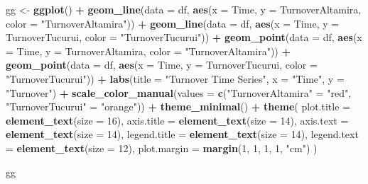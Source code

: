 \documentclass[
]{article}
\newenvironment{Shaded}{\begin{snugshade}}{\end{snugshade}}
\newcommand{\AttributeTok}[1]{\textcolor[rgb]{0.13,0.29,0.53}{#1}}
\newcommand{\DecValTok}[1]{\textcolor[rgb]{0.00,0.00,0.81}{#1}}
\newcommand{\FunctionTok}[1]{\textcolor[rgb]{0.13,0.29,0.53}{\textbf{#1}}}
\newcommand{\NormalTok}[1]{#1}
\newcommand{\OtherTok}[1]{\textcolor[rgb]{0.56,0.35,0.01}{#1}}
\newcommand{\SpecialCharTok}[1]{\textcolor[rgb]{0.81,0.36,0.00}{\textbf{#1}}}
\newcommand{\StringTok}[1]{\textcolor[rgb]{0.31,0.60,0.02}{#1}}
\begin{document}
\begin{Shaded}
\begin{Highlighting}[]
\NormalTok{gg }\OtherTok{\textless{}{-}} \FunctionTok{ggplot}\NormalTok{() }\SpecialCharTok{+}
  \FunctionTok{geom\_line}\NormalTok{(}\AttributeTok{data =}\NormalTok{ df, }\FunctionTok{aes}\NormalTok{(}\AttributeTok{x =}\NormalTok{ Time, }\AttributeTok{y =}\NormalTok{ TurnoverAltamira, }\AttributeTok{color =} \StringTok{"TurnoverAltamira"}\NormalTok{)) }\SpecialCharTok{+}
  \FunctionTok{geom\_line}\NormalTok{(}\AttributeTok{data =}\NormalTok{ df, }\FunctionTok{aes}\NormalTok{(}\AttributeTok{x =}\NormalTok{ Time, }\AttributeTok{y =}\NormalTok{ TurnoverTucurui, }\AttributeTok{color =} \StringTok{"TurnoverTucurui"}\NormalTok{)) }\SpecialCharTok{+}
  \FunctionTok{geom\_point}\NormalTok{(}\AttributeTok{data =}\NormalTok{ df, }\FunctionTok{aes}\NormalTok{(}\AttributeTok{x =}\NormalTok{ Time, }\AttributeTok{y =}\NormalTok{ TurnoverAltamira, }\AttributeTok{color =} \StringTok{"TurnoverAltamira"}\NormalTok{)) }\SpecialCharTok{+}
  \FunctionTok{geom\_point}\NormalTok{(}\AttributeTok{data =}\NormalTok{ df, }\FunctionTok{aes}\NormalTok{(}\AttributeTok{x =}\NormalTok{ Time, }\AttributeTok{y =}\NormalTok{ TurnoverTucurui, }\AttributeTok{color =} \StringTok{"TurnoverTucurui"}\NormalTok{)) }\SpecialCharTok{+}
  \FunctionTok{labs}\NormalTok{(}\AttributeTok{title =} \StringTok{"Turnover Time Series"}\NormalTok{,}
       \AttributeTok{x =} \StringTok{"Time"}\NormalTok{,}
       \AttributeTok{y =} \StringTok{"Turnover"}\NormalTok{) }\SpecialCharTok{+}
  \FunctionTok{scale\_color\_manual}\NormalTok{(}\AttributeTok{values =} \FunctionTok{c}\NormalTok{(}\StringTok{"TurnoverAltamira"} \OtherTok{=} \StringTok{"red"}\NormalTok{, }\StringTok{"TurnoverTucurui"} \OtherTok{=} \StringTok{"orange"}\NormalTok{)) }\SpecialCharTok{+}
  \FunctionTok{theme\_minimal}\NormalTok{() }\SpecialCharTok{+}
  \FunctionTok{theme}\NormalTok{(}
    \AttributeTok{plot.title =} \FunctionTok{element\_text}\NormalTok{(}\AttributeTok{size =} \DecValTok{16}\NormalTok{),}
    \AttributeTok{axis.title =} \FunctionTok{element\_text}\NormalTok{(}\AttributeTok{size =} \DecValTok{14}\NormalTok{),}
    \AttributeTok{axis.text =} \FunctionTok{element\_text}\NormalTok{(}\AttributeTok{size =} \DecValTok{14}\NormalTok{),}
    \AttributeTok{legend.title =} \FunctionTok{element\_text}\NormalTok{(}\AttributeTok{size =} \DecValTok{14}\NormalTok{),}
    \AttributeTok{legend.text =} \FunctionTok{element\_text}\NormalTok{(}\AttributeTok{size =} \DecValTok{12}\NormalTok{),}
    \AttributeTok{plot.margin =} \FunctionTok{margin}\NormalTok{(}\DecValTok{1}\NormalTok{, }\DecValTok{1}\NormalTok{, }\DecValTok{1}\NormalTok{, }\DecValTok{1}\NormalTok{, }\StringTok{"cm"}\NormalTok{)}
\NormalTok{  )}

\NormalTok{gg}
\end{Highlighting}
\end{Shaded}
\end{document}
